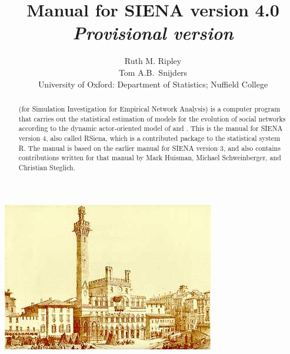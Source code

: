\documentclass[a4paper,fleqn]{article}
\title{\color{section0}{\Huge Manual for \textsf{SIENA} version 4.0} }
\title{{\Huge Manual for \textsf{SIENA} version 4.0 \protect\newline \normalsize \emph{Provisional version} } }
\author{\color{section1}\Large Ruth M. Ripley\\[1ex]
        \color{section1}\Large Tom A.B.\ Snijders\\[4ex]
       {\color{section1}\large University of Oxford: Department of Statistics; Nuffield College}\\[1ex]
    }
\newcommand{\+}{\, + \,}
\newcommand{\Rn}{{\sf R}}
\newcommand{\rs}{{\sf RSiena}}
\newcommand{\SI}{{\sf SIENA }}
\begin{document}
\begin{print}
\end{print}

\maketitle

\begin{screen}
\vfill
\end{screen}
\begin{print}

\vfill
\begin{center}
\includegraphics*[scale=3]{ilcampo.jpg}
\end{center}
\vfill
\end{print}

\begin{abstract}
\noindent \SI (for {\sf Simulation Investigation for Empirical
Network Analysis}) is a computer program that carries out the
statistical estimation of models for the evolution of social
networks according to the dynamic actor-oriented model of \citet{Snijders01,
Snijders05} and \citet{SnijdersEA07}.
This is the manual for \SI version 4,
also called \rs,
which is a contributed package to
the statistical system \Rn.
The manual is based on the earlier manual for \SI version 3,
and also contains contributions written for that manual by
Mark Huisman, Michael Schweinberger, and Christian Steglich.
\end{abstract}



\end{document}
